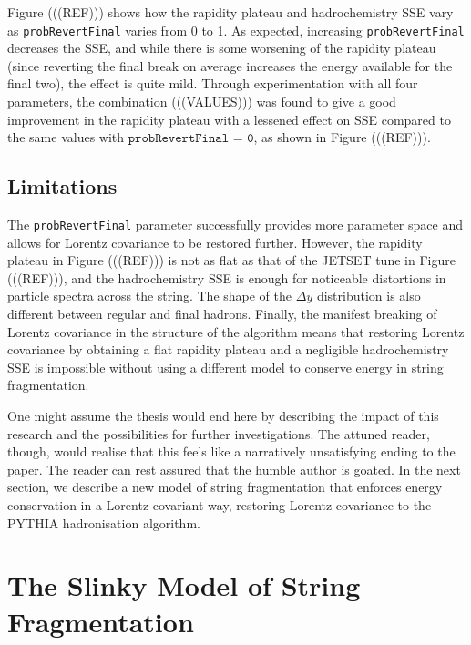 \documentclass[12pt,a4paper]{report}
\begin{document}
Figure (((REF))) shows how the rapidity plateau and hadrochemistry SSE vary as \texttt{probRevertFinal} varies from 0 to 1. As expected, increasing \texttt{probRevertFinal} decreases the SSE, and while there is some worsening of the rapidity plateau (since reverting the final break on average increases the energy available for the final two), the effect is quite mild. Through experimentation with all four parameters, the combination (((VALUES))) was found to give a good improvement in the rapidity plateau with a lessened effect on SSE compared to the same values with $\texttt{probRevertFinal = 0}$, as shown in Figure (((REF))). 

\section{Limitations}
The \texttt{probRevertFinal} parameter successfully provides more parameter space and allows for Lorentz covariance to be restored further. However, the rapidity plateau in Figure (((REF))) is not as flat as that of the JETSET tune in Figure (((REF))), and the hadrochemistry SSE is enough for noticeable distortions in particle spectra across the string. The shape of the $\Delta y$ distribution is also different between regular and final hadrons. Finally, the manifest breaking of Lorentz covariance in the structure of the algorithm means that restoring Lorentz covariance by obtaining a flat rapidity plateau and a negligible hadrochemistry SSE is impossible without using a different model to conserve energy in string fragmentation.

One might assume the thesis would end here by describing the impact of this research and the possibilities for further investigations. The attuned reader, though, would realise that this feels like a narratively unsatisfying ending to the paper. The reader can rest assured that the humble author is goated. In the next section, we describe a new model of string fragmentation that enforces energy conservation in a Lorentz covariant way, restoring Lorentz covariance to the PYTHIA hadronisation algorithm.

\chapter{The Slinky Model of String Fragmentation}
\label{chap:accordion}
\end{document}

